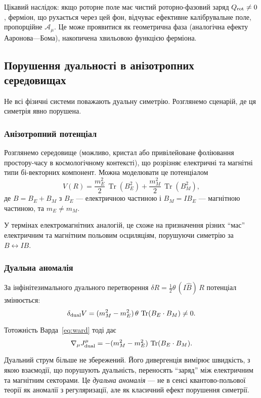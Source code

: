 \documentclass[11pt,a4paper]{article}
\numberwithin{equation}{section}
\theoremstyle{plain}
\theoremstyle{definition}
\theoremstyle{remark}
\DeclareMathOperator{\Tr}{Tr}
\begin{document}
Цікавий наслідок: якщо роторне поле має чистий роторно-фазовий заряд $Q_{\rm rot} \neq 0$, ферміон, що рухається через цей фон, відчуває ефективне калібрувальне поле, пропорційне $\mathcal{A}_\mu$. Це може проявитися як геометрична фаза (аналогічна ефекту Ааронова—Бома), накопичена хвильовою функцією ферміона.

\subsection{Порушення дуальності в анізотропних середовищах}

Не всі фізичні системи поважають дуальну симетрію. Розглянемо сценарій, де ця симетрія явно порушена.

\subsubsection{Анізотропний потенціал}

Розглянемо середовище (можливо, кристал або привілейоване фоліювання простору-часу в космологічному контексті), що розрізняє електричні та магнітні типи бі-векторних компонент. Можна моделювати це потенціалом
\begin{equation}
V(R) = \frac{m_E^2}{2}\,\Tr(B_E^2) + \frac{m_M^2}{2}\,\Tr(B_M^2),
\end{equation}
де $B = B_E + B_M$ з $B_E$ — електричною частиною і $B_M = IB_E$ — магнітною частиною, та $m_E \neq m_M$.

У термінах електромагнітних аналогій, це схоже на призначення різних ``мас'' електричним та магнітним польовим осциляціям, порушуючи симетрію за $B \leftrightarrow IB$.

\subsubsection{Дуальна аномалія}

За інфінітезимального дуального перетворення $\delta R = \frac{1}{2}\theta\,(I\hat{B})\,R$ потенціал змінюється:
\begin{equation}
\delta_{\rm dual} V = (m_M^2 - m_E^2)\,\theta\,\Tr(B_E\cdot B_M) \neq 0.
\end{equation}

Тотожність Варда~\eqref{eq:ward} тоді дає
\begin{equation}
\nabla_\mu J^\mu_{\rm dual} = -(m_M^2 - m_E^2)\,\Tr(B_E\cdot B_M).
\end{equation}

Дуальний струм більше не збережений. Його дивергенція вимірює швидкість, з якою взаємодії, що порушують дуальність, переносять ``заряд'' між електричним та магнітним секторами. Це \emph{дуальна аномалія} — не в сенсі квантово-польової теорії як аномалії з регуляризації, але як класичний ефект порушення симетрії.
\end{document}
